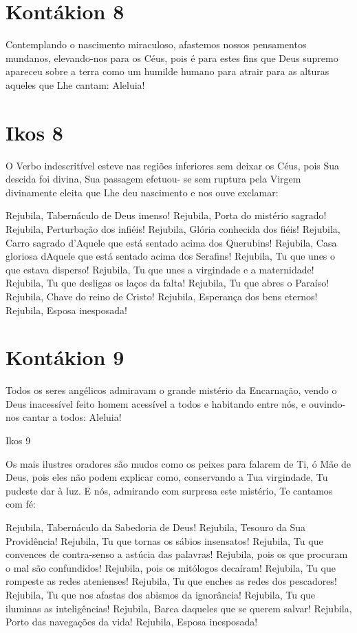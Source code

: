 \documentclass{subfiles}
\begin{document}
\section*{Kontákion 8}

Contemplando o nascimento miraculoso, afastemos nossos
pensamentos mundanos, elevando-nos para os Céus, pois é para estes fins que
Deus supremo apareceu sobre a terra como um humilde humano para atrair
para as alturas aqueles que Lhe cantam: Aleluia!

\section*{Ikos 8}

O Verbo indescritível esteve nas regiões inferiores sem deixar os Céus,
pois Sua descida foi divina, Sua passagem efetuou- se sem ruptura pela Virgem
divinamente eleita que Lhe deu nascimento e nos ouve exclamar:

Rejubila, Tabernáculo de Deus imenso!
Rejubila, Porta do mistério sagrado!
Rejubila, Perturbação dos infiéis!
Rejubila, Glória conhecida dos fiéis!
Rejubila, Carro sagrado d'Aquele que está sentado acima dos Querubins!
Rejubila, Casa gloriosa dAquele que está sentado acima dos Serafins!
Rejubila, Tu que unes o que estava disperso!
Rejubila, Tu que unes a virgindade e a maternidade!
Rejubila, Tu que desligas os laços da falta!
Rejubila, Tu que abres o Paraíso!
Rejubila, Chave do reino de Cristo!
Rejubila, Esperança dos bens eternos!
Rejubila, Esposa inesposada!

\section*{Kontákion 9}

Todos os seres angélicos admiravam o grande mistério da Encarnação,
vendo o Deus inacessível feito homem acessível a todos e habitando entre nós,
e ouvindo-nos cantar a todos: Aleluia!

Ikos 9

Os mais ilustres oradores são mudos como os peixes para falarem de
Ti, ó Mãe de Deus, pois eles não podem explicar como, conservando a Tua
virgindade, Tu pudeste dar à luz. E nós, admirando com surpresa este mistério,
Te cantamos com fé:

Rejubila, Tabernáculo da Sabedoria de Deus!
Rejubila, Tesouro da Sua Providência!
Rejubila, Tu que tornas os sábios insensatos!
Rejubila, Tu que convences de contra-senso a astúcia das palavras!
Rejubila, pois os que procuram o mal são confundidos!
Rejubila, pois os mitólogos decaíram!
Rejubila, Tu que rompeste as redes atenienses!
Rejubila, Tu que enches as redes dos pescadores!
Rejubila, Tu que nos afastas dos abismos da ignorância!
Rejubila, Tu que iluminas as inteligências!
Rejubila, Barca daqueles que se querem salvar!
Rejubila, Porto das navegações da vida!
Rejubila, Esposa inesposada!
\end{document}
